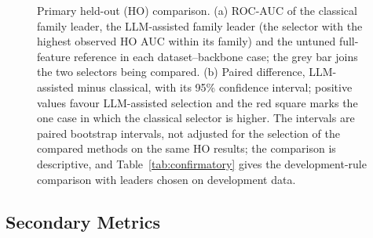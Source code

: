 \documentclass[final,5p,twocolumn]{elsarticle}
\begin{document}
\begin{figure}[htbp]
\caption{Primary held-out (HO) comparison. (a) ROC-AUC of the classical family leader, the LLM-assisted family leader (the selector with the highest observed HO AUC within its family) and the untuned full-feature reference in each dataset--backbone case; the grey bar joins the two selectors being compared. (b) Paired difference, LLM-assisted minus classical, with its 95\% confidence interval; positive values favour LLM-assisted selection and the red square marks the one case in which the classical selector is higher. The intervals are paired bootstrap intervals, not adjusted for the selection of the compared methods on the same HO results; the comparison is descriptive, and Table~\ref{tab:confirmatory} gives the development-rule comparison with leaders chosen on development data.}
\label{fig:primary}
\end{figure}

\subsection{Secondary Metrics}
\label{subsec:secondary_results}
\end{document}
